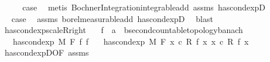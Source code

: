 \begin{isabellebody}
\ \ \isamarkupfalse%
\ \isamarkupfalse%
\ {\isacharquery}{\kern0pt}case\ \isamarkupfalse%
\ {\isacharparenleft}{\kern0pt}metis\ Bochner{\isacharunderscore}{\kern0pt}Integration{\isachardot}{\kern0pt}integrable{\isacharunderscore}{\kern0pt}add\ assms\ has{\isacharunderscore}{\kern0pt}cond{\isacharunderscore}{\kern0pt}expD{\isacharparenleft}{\kern0pt}{}{\isacharparenright}{\kern0pt}{\isacharparenright}{\kern0pt}\isanewline
{}\isamarkupfalse%
\isanewline
\ \ \isamarkupfalse%
\ {}\isanewline
\ \ \isamarkupfalse%
\ \isamarkupfalse%
\ {\isacharquery}{\kern0pt}case\ \isamarkupfalse%
\ assms\ borel{\isacharunderscore}{\kern0pt}measurable{\isacharunderscore}{\kern0pt}add\ has{\isacharunderscore}{\kern0pt}cond{\isacharunderscore}{\kern0pt}expD{\isacharparenleft}{\kern0pt}{}{\isacharparenright}{\kern0pt}\ \isamarkupfalse%
\ blast\isanewline
{}\isamarkupfalse%
%
\endisatagproof
{\isafoldproof}%
%
\isadelimproof
\isanewline
%
\endisadelimproof
\isanewline
{}\isamarkupfalse%
\ has{\isacharunderscore}{\kern0pt}cond{\isacharunderscore}{\kern0pt}exp{\isacharunderscore}{\kern0pt}scaleR{\isacharunderscore}{\kern0pt}right{\isacharcolon}{\kern0pt}\isanewline
\ \ \ f\ {\isacharcolon}{\kern0pt}{\isacharcolon}{\kern0pt}\ {\isachardoublequoteopen}{\isacharprime}{\kern0pt}a\ {\isasymRightarrow}\ {\isacharprime}{\kern0pt}b{\isacharcolon}{\kern0pt}{\isacharcolon}{\kern0pt}{\isacharbraceleft}{\kern0pt}second{\isacharunderscore}{\kern0pt}countable{\isacharunderscore}{\kern0pt}topology{\isacharcomma}{\kern0pt}banach{\isacharbraceright}{\kern0pt}{\isachardoublequoteclose}\isanewline
\ \ \ {\isachardoublequoteopen}has{\isacharunderscore}{\kern0pt}cond{\isacharunderscore}{\kern0pt}exp\ M\ F\ f\ f{\isacharprime}{\kern0pt}{\isachardoublequoteclose}\isanewline
\ \ \ {\isachardoublequoteopen}has{\isacharunderscore}{\kern0pt}cond{\isacharunderscore}{\kern0pt}exp\ M\ F\ {\isacharparenleft}{\kern0pt}{\isasymlambda}x{\isachardot}{\kern0pt}\ c\ {\isacharasterisk}{\kern0pt}\isactrlsub R\ f\ x{\isacharparenright}{\kern0pt}\ {\isacharparenleft}{\kern0pt}{\isasymlambda}x{\isachardot}{\kern0pt}\ c\ {\isacharasterisk}{\kern0pt}\isactrlsub R\ f{\isacharprime}{\kern0pt}\ x{\isacharparenright}{\kern0pt}{\isachardoublequoteclose}\isanewline
%
\isadelimproof
\ \ %
\endisadelimproof
%
\isatagproof
{}\isamarkupfalse%
\ has{\isacharunderscore}{\kern0pt}cond{\isacharunderscore}{\kern0pt}expD{\isacharbrackleft}{\kern0pt}OF\ assms{\isacharbrackright}{\kern0pt}\ \isamarkupfalse%

\end{isabellebody}
